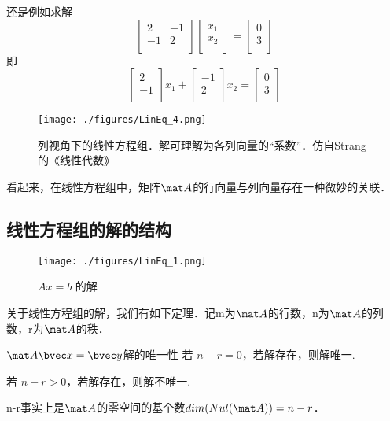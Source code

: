 \begin{example}{}
还是例如求解
$$
\begin{bmatrix}
2&-1\\
-1&2\\
\end{bmatrix}
\begin{bmatrix}
x_1\\
x_2\\
\end{bmatrix}
=
\begin{bmatrix}
0\\
3\\
\end{bmatrix}
$$
即
$$
\begin{bmatrix}
2\\
-1\\
\end{bmatrix}
x_1
+
\begin{bmatrix}
-1\\
2\\
\end{bmatrix}
x_2
=
\begin{bmatrix}
0\\
3\\
\end{bmatrix}
$$
\begin{figure}[ht]
\centering
\texttt{[image: ./figures/LinEq\_4.png]}
\caption{列视角下的线性方程组．解可理解为各列向量的“系数”．仿自Strang的《线性代数》} \label{LinEq_fig4}
\end{figure}
\end{example}
看起来，在线性方程组中，矩阵$\mat A$的行向量与列向量存在一种微妙的关联．

\subsection{线性方程组的解的结构}
\begin{figure}[ht]
\centering
\texttt{[image: ./figures/LinEq\_1.png]}
\caption{$Ax=b$ 的解} \label{LinEq_fig1}
\end{figure}

关于线性方程组的解，我们有如下定理．记m为$\mat A$的行数，n为$\mat A$的列数，r为$\mat A$的秩．
\begin{theorem}{$\mat A \bvec x=\bvec y$解的唯一性}
若 $n-r=0$，若解存在，则解唯一.

若 $n-r>0$，若解存在，则解不唯一.
\end{theorem}
n-r事实上是$\mat A$的零空间的基个数$dim(Nul(\mat A))=n-r$．

